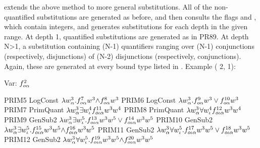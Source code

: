  extends the above method to more general substitutions.
All of the non-quantified substitutions are generated as before, and then {\TPS}
consults the flags  and , which
contain integers, and generates substitutions for each depth in the given range.
At depth 1, quantified substitutions are generated as in PR89.
At depth N>1, a substitution containing (N-1) quantifiers ranging over (N-1) conjunctions
(respectively, disjunctions) of (N-2) disjunctions (respectively, conjunctions). Again, these are generated
at every bound type listed in . Example ( 2,
 1):
\begin{tpsexample}
 Var:   \(f\sp{{2}}\sb{o\alpha}\)

     PRIM5   LogConst     \(\lambda w\sp{{3}}\sb{\alpha} .f \sp{{7}}\sb{o\alpha}  w \sp{{3}}  \mathord{\wedge} f \sp{{8}}\sb{o\alpha}  w \sp{{3}}\)
     PRIM6   LogConst     \(\lambda w \sp{{3}}\sb{\alpha} .f \sp{{9}}\sb{o\alpha}  w \sp{{3}}  \lor f \sp{{10}}\sb{o\alpha}  w \sp{{3}}\)
     PRIM7   PrimQuant   \(\lambda w \sp{{3}}\sb{\alpha}   \exists w \sp{{4}}\sb{\iota}  f \sp{{11}}\sb{o\iota\alpha}  w \sp{{3}}  w \sp{{4}}\)
     PRIM8   PrimQuant   \(\lambda w \sp{{3}}\sb{\alpha}   \forall w \sp{{4}}\sb{\iota}  f \sp{{12}}\sb{o\iota\alpha}  w \sp{{3}}  w \sp{{4}}\)
     PRIM9   GenSub2   \(\lambda w \sp{{3}}\sb{\alpha}   \exists w \sp{{5}}\sb{\iota} .f \sp{{13}}\sb{o\iota\alpha}  w \sp{{3}}  w \sp{{5}}  \lor f \sp{{14}}\sb{o\iota\alpha}  w \sp{{3}}  w \sp{{5}}\)
     PRIM10  GenSub2   \(\lambda w \sp{{3}}\sb{\alpha}   \exists w \sp{{5}}\sb{\iota} .f \sp{{15}}\sb{o\iota\alpha}  w \sp{{3}}  w \sp{{5}}  \mathord{\wedge} f \sp{{16}}\sb{o\iota\alpha}  w \sp{{3}}  w \sp{{5}}\)
     PRIM11  GenSub2   \(\lambda w \sp{{3}}\sb{\alpha}   \forall w \sp{{5}}\sb{\iota} .f \sp{{17}}\sb{o\iota\alpha}  w \sp{{3}}  w \sp{{5}}  \lor f \sp{{18}}\sb{o\iota\alpha}  w \sp{{3}}  w \sp{{5}}\)
     PRIM12  GenSub2   \( \lambda w \sp{{3}}\sb{\alpha}   \forall w \sp{{5}}\sb{\iota} .f \sp{{19}}\sb{o\iota\alpha}  w \sp{{3}}  w \sp{{5}}  \mathord{\wedge} f \sp{{20}}\sb{o\iota\alpha}  w \sp{{3}}  w \sp{{5}}\)
\end{tpsexample}

